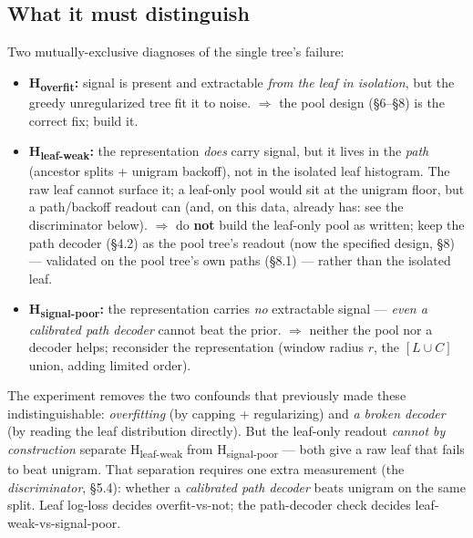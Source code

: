 \documentclass[11pt]{article}
\begin{document}
\subsection{What it must distinguish}
Two mutually-exclusive diagnoses of the single tree's failure:
\begin{itemize}[nosep]
\item \textbf{H\textsubscript{overfit}:} signal is present and extractable \emph{from the leaf in isolation}, but the greedy unregularized tree fit it to noise. $\Rightarrow$ the pool design (\S6--\S8) is the correct fix; build it.
\item \textbf{H\textsubscript{leaf-weak}:} the representation \emph{does} carry signal, but it lives in the \emph{path} (ancestor splits + unigram backoff), not in the isolated leaf histogram. The raw leaf cannot surface it; a leaf-only pool would sit at the unigram floor, but a path/backoff readout can (and, on this data, already has: see the discriminator below). $\Rightarrow$ do \textbf{not} build the leaf-only pool as written; keep the path decoder (\S4.2) as the pool tree's readout (now the specified design, \S8) --- validated on the pool tree's own paths (\S8.1) --- rather than the isolated leaf.
\item \textbf{H\textsubscript{signal-poor}:} the representation carries \emph{no} extractable signal --- \emph{even a calibrated path decoder} cannot beat the prior. $\Rightarrow$ neither the pool nor a decoder helps; reconsider the representation (window radius $r$, the $[L\cup C]$ union, adding limited order).
\end{itemize}
The experiment removes the two confounds that previously made these indistinguishable: \emph{overfitting} (by capping + regularizing) and \emph{a broken decoder} (by reading the leaf distribution directly). But the leaf-only readout \emph{cannot by construction} separate H\textsubscript{leaf-weak} from H\textsubscript{signal-poor} --- both give a raw leaf that fails to beat unigram. That separation requires one extra measurement (the \emph{discriminator}, \S5.4): whether a \emph{calibrated path decoder} beats unigram on the same split. Leaf log-loss decides overfit-vs-not; the path-decoder check decides leaf-weak-vs-signal-poor.
\end{document}
